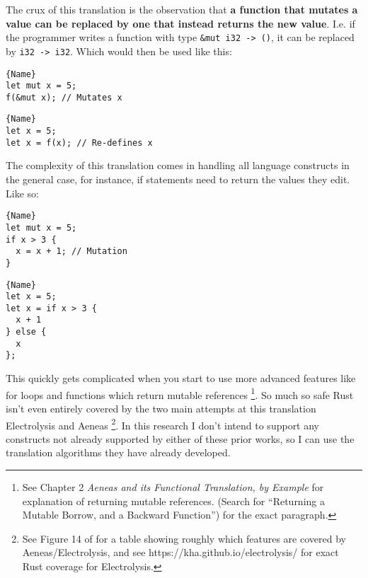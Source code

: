 \documentclass[12pt,twoside]{report}
\begin{document}
The crux of this translation is the observation that \textbf{a function that mutates a value can be replaced by one that instead returns the new value}. I.e. if the programmer writes a function with type \verb|&mut i32 -> ()|, it can be replaced by \verb|i32 -> i32|. Which would then be used like this:

\noindent\begin{minipage}{.45\textwidth}
\begin{lstlisting}[caption=Original]{Name}
let mut x = 5;
f(&mut x); // Mutates x
\end{lstlisting}
\end{minipage}\hfill
\begin{minipage}{.45\textwidth}
\begin{lstlisting}[caption=Translated]{Name}
let x = 5;
let x = f(x); // Re-defines x
\end{lstlisting}
\end{minipage}

The complexity of this translation comes in handling all language constructs in the general case, for instance, if statements need to return the values they edit. Like so:

\noindent\begin{minipage}{.45\textwidth}
\begin{lstlisting}[caption=Original]{Name}
let mut x = 5;
if x > 3 {
  x = x + 1; // Mutation
}
\end{lstlisting}
\end{minipage}\hfill
\begin{minipage}{.45\textwidth}
\begin{lstlisting}[caption=Translated]{Name}
let x = 5;
let x = if x > 3 {
  x + 1
} else {
  x
};
\end{lstlisting}
\end{minipage}

This quickly gets complicated when you start to use more advanced features like for loops and functions which return mutable references \footnote{See \cite{aeneas} Chapter 2 \textit{Aeneas and its Functional Translation, by Example} for explanation of returning mutable references. (Search for ``Returning a Mutable Borrow, and a Backward Function'') for the exact paragraph.}. So much so safe Rust isn't even entirely covered by the two main attempts at this translation Electrolysis \cite{ullrich_khaelectrolysis_2024} and Aeneas \cite{aeneas} \footnote{See Figure 14 of \cite{aeneas} for a table showing roughly which features are covered by Aeneas/Electrolysis, and see https://kha.github.io/electrolysis/ for exact Rust coverage for Electrolysis.}. In this research I don't intend to support any constructs not already supported by either of these prior works, so I can use the translation algorithms they have already developed.
\end{document}
